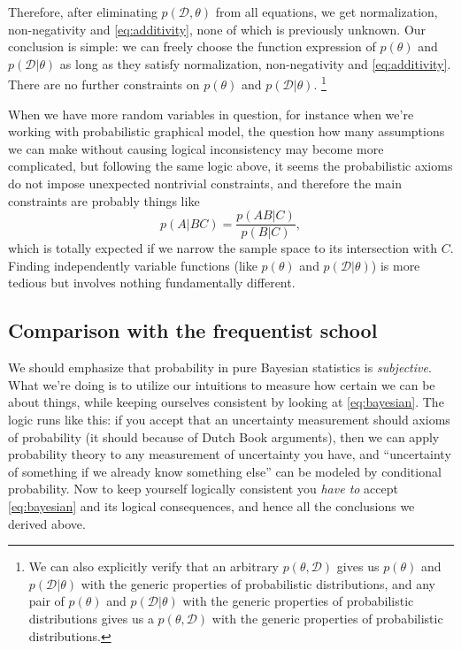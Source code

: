\documentclass[hyperref, a4paper]{article}
\begin{document}
Therefore, after eliminating $p(\mathcal{D}, \theta)$ from all equations,
we get normalization, non-negativity and \eqref{eq:additivity},
none of which is previously unknown.
Our conclusion is simple:
we can freely choose the function expression of $p(\theta)$ and $p(\mathcal{D} | \theta)$
as long as they satisfy normalization, non-negativity and \eqref{eq:additivity}.
There are no further constraints on $p(\theta)$ and $p(\mathcal{D} | \theta)$.%
\footnote{
    We can also explicitly verify that an arbitrary $p(\theta, \mathcal{D})$ gives us $p(\theta)$ and $p(\mathcal{D} | \theta)$ with the generic properties of probabilistic distributions,
    and any pair of $p(\theta)$ and $p(\mathcal{D} | \theta)$ with the generic properties of probabilistic distributions gives us a $p(\theta, \mathcal{D})$ with the generic properties of probabilistic distributions.
}

When we have more random variables in question,
for instance when we're working with probabilistic graphical model,
the question how many assumptions we can make without causing logical inconsistency may become more complicated,
but following the same logic above, it seems the probabilistic axioms do not impose unexpected nontrivial constraints,
and therefore the main constraints are probably things like 
\begin{equation}
    p(A|BC) = \frac{p(AB | C)}{p(B | C)},
\end{equation}
which is totally expected if we narrow the sample space to its intersection with $C$.
Finding independently variable functions (like $p(\theta)$ and $p(\mathcal{D} | \theta)$) is more tedious but involves nothing fundamentally different.

\subsection{Comparison with the frequentist school}\label{sec:frequentist-comparison}

We should emphasize that probability in pure Bayesian statistics is \emph{subjective}.
What we're doing is to utilize our intuitions to measure how certain we can be about things,
while keeping ourselves consistent by looking at \eqref{eq:bayesian}.
The logic runs like this: if you accept that an uncertainty measurement should axioms of probability
(it should because of Dutch Book arguments),
then we can apply probability theory to any measurement of uncertainty you have,
and ``uncertainty of something if we already know something else'' 
can be modeled by conditional probability.
Now to keep yourself logically consistent you \emph{have to} accept \eqref{eq:bayesian}
and its logical consequences, and hence all the conclusions we derived above.
\end{document}
